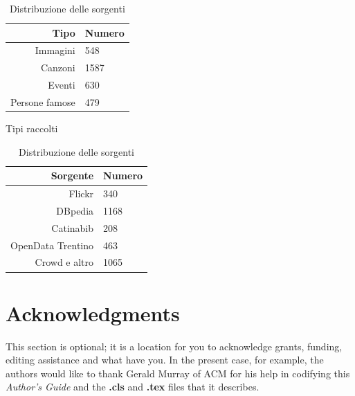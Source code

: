 \documentclass{acm_proc_article-sp}
\begin{document}
\begin{table}
\parbox{.45\linewidth}{
\centering
\begin{tabular}{|r|l|}
\hline
Tipo & Numero \\
\hline
Immagini & 548 \\
Canzoni & 1587 \\
Eventi & 630 \\
Persone famose & 479 \\
\hline
\end{tabular}
\caption{Tipi raccolti}
\label{tab:entitykind}
}
\hfill
\parbox{.45\linewidth}{
\centering
\begin{tabular}{|r|l|}
\hline
Sorgente & Numero \\
\hline
Flickr & 340 \\
DBpedia & 1168 \\
Catinabib & 208 \\
OpenData Trentino & 463 \\
Crowd e altro & 1065 \\
\hline
\end{tabular}
\caption{Distribuzione delle sorgenti}
\label{tab:entitysource}
}
\end{table}





\section{Acknowledgments}
This section is optional; it is a location for you
to acknowledge grants, funding, editing assistance and
what have you.  In the present case, for example, the
authors would like to thank Gerald Murray of ACM for
his help in codifying this \textit{Author's Guide}
and the \textbf{.cls} and \textbf{.tex} files that it describes.

%

%
%
\appendix
\end{document}
